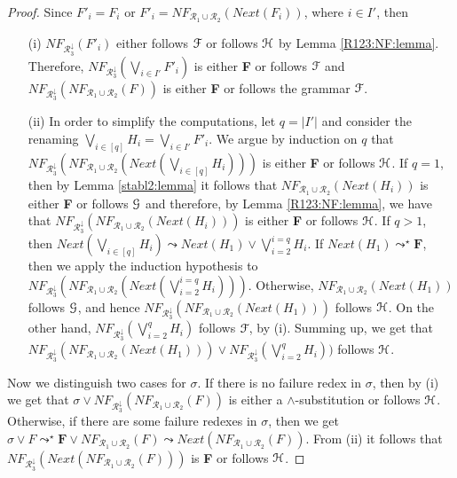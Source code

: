 \documentclass[submission,copyright,creativecommons]{eptcs}
\newcommand \Ronetwo{\ensuremath{\mathcal{R}_1\cup\mathcal{R}_2}}
\newcommand \Rthree{\ensuremath{\mathcal{R}_3^{\downarrow}}}
\newcommand \Eu[1]{\EuScript{#1}}
\numberwithin{subcase}{case}
\begin{document}
\begin{proof}
Since  $F'_i=F_i$ or $F'_i=\textit{NF}_{\Ronetwo}(Next(F_i))$, where $i\in I'$,
then  
\begin{enumerate}
  \item[(i)] 
 $\textit{NF}_{\Rthree}(F'_i)$ either follows $\Eu{F}$ or
 follows $\Eu{H}$ by   Lemma \ref{R123:NF:lemma}. 
Therefore, $\textit{NF}_{\Rthree}(\bigvee_{i \in I'}F'_i)$ is either 
\textbf{F} or follows $\Eu{F}$ and $\textit{NF}_{\Rthree}(\textit{NF}_{\Ronetwo}(F))$ is either \textbf{F} or follows the grammar 
$\Eu{F}$. 
\item[(ii)] In order to simplify the computations,  
let  $q=|I'|$ and consider the renaming 
$\bigvee_{i\in [q]} H_i=\bigvee_{i\in I'} F'_i$. 
We argue by induction on $q$ that 
$\textit{NF}_{\Rthree}(\textit{NF}_{\Ronetwo}(Next(\bigvee_{i\in [q]}H_i)))$ 
is either \textbf{F} or follows $\Eu{H}$. 
If $q=1$, then by Lemma \ref{stabl2:lemma} it follows that 
$\textit{NF}_{\Ronetwo}(Next(H_i))$ is either \textbf{F} or 
 follows $\Eu{G}$ and therefore, by Lemma \ref{R123:NF:lemma},
we have that $\textit{NF}_{\Rthree}(\textit{NF}_{\Ronetwo}(Next(H_i)))$ is either 
\textbf{F} or follows $\Eu{H}$.
If $q>1$, then 
$Next(\bigvee_{i\in [q]}H_i)\leadsto Next(H_1) \lor \bigvee_{i=2}^{i=q}H_i$.
If $Next(H_1) \leadsto^{\star} \textbf{F}$, then we apply the induction 
hypothesis to 
$\textit{NF}_{\Rthree}(\textit{NF}_{\Ronetwo}(Next(\bigvee_{i=2}^{i=q}H_i)))$. Otherwise,
$\textit{NF}_{\Ronetwo}(Next(H_1))$ follows $\Eu{G}$, and hence 
$\textit{NF}_{\Rthree}(\textit{NF}_{\Ronetwo}(Next(H_1)))$ follows $\Eu{H}$. On the other 
hand, $\textit{NF}_{\Rthree}(\bigvee_{i=2}^{q}H_i)$ follows $\Eu{F}$,
by (i). Summing up, we get that $\textit{NF}_{\Rthree}(\textit{NF}_{\Ronetwo}(Next(H_1))) \lor 
\textit{NF}_{\Rthree}(\bigvee_{i=2}^{q}H_i))$ follows $\Eu{H}$.
\end{enumerate}

Now we distinguish two cases for $\sigma$.  If there is no failure redex in
$\sigma$, then by (i) we get that $\sigma \lor \textit{NF}_{\Rthree}(\textit{NF}_{\Ronetwo}(F))$
is either a $\land$-substitution or follows $\Eu{H}$. 
Otherwise, if there are some failure redexes in $\sigma$, then
 we get $\sigma \lor F \leadsto^{\star} \textbf{F}\lor \textit{NF}_{\Ronetwo}(F) 
\leadsto Next(\textit{NF}_{\Ronetwo}(F))$. From (ii)
it follows that $\textit{NF}_{\Rthree}(Next(\textit{NF}_{\Ronetwo}(F)))$ is  \textbf{F}
or follows $\Eu{H}$.
 \end{proof}
\end{document}
